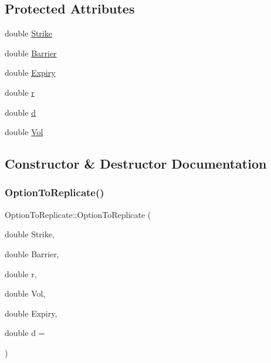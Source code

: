 \subsection*{Protected Attributes}
\begin{DoxyCompactItemize}
\item 
double \hyperlink{classOptionToReplicate_a64ffcbc25fc60c5dc18ca4b78194ca89}{Strike}
\item 
double \hyperlink{classOptionToReplicate_a7cd35379de855ad6e53008fbf7e9dda0}{Barrier}
\item 
double \hyperlink{classOptionToReplicate_a62014eac88a2a766ed674be69e9fd926}{Expiry}
\item 
double \hyperlink{classOptionToReplicate_ad344ef3a4a4e93372c390c60420d1a61}{r}
\item 
double \hyperlink{classOptionToReplicate_aa088a512c974dc622ca1bbca61ec5e34}{d}
\item 
double \hyperlink{classOptionToReplicate_a3a28b1ab0cd1ee635b3c31998bd2c572}{Vol}
\end{DoxyCompactItemize}


\subsection{Constructor \& Destructor Documentation}
\hypertarget{classOptionToReplicate_a0fd76dc048a75371e306275fdd5a2aa5}{}\label{classOptionToReplicate_a0fd76dc048a75371e306275fdd5a2aa5} 
\subsubsection{\texorpdfstring{Option\+To\+Replicate()}{OptionToReplicate()}\hspace{0.1cm}{\footnotesize\ttfamily [1/2]}}
{\footnotesize\ttfamily Option\+To\+Replicate\+::\+Option\+To\+Replicate (\begin{DoxyParamCaption}\item[{double}]{Strike,  }\item[{double}]{Barrier,  }\item[{double}]{r,  }\item[{double}]{Vol,  }\item[{double}]{Expiry,  }\item[{double}]{d = {} }\end{DoxyParamCaption})}

